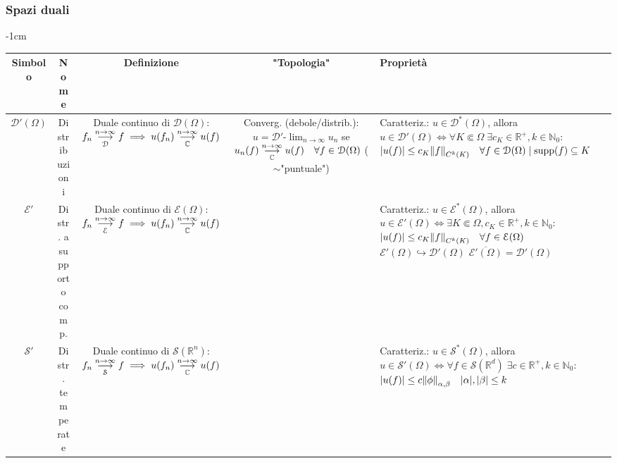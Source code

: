 \documentclass[a4paper,10pt]{article}
\theoremstyle{definition}
\newcommand{\na}{\mathbb{N}} %
\newcommand{\re}{\mathbb{R}} %
\newcommand{\im}{\mathbb{C}} %
\newcommand{\inj}{\hookrightarrow} %
\newcommand{\supp}{\text{supp}} %
\newcommand{\llim}[2]{#2\text{-}\lim_{#1\to\infty}} %
\newcommand{\limm}[2]{\overunderset{#1\to\infty}{#2}{\longrightarrow}} %
\theoremstyle{indentdefinition}
\theoremstyle{indenttheorem}
\theoremstyle{myremark}
\theoremstyle{indentgeneral}
\begin{document}
\begin{landscape}
\subsubsection{Spazi duali}
\begin{adjustwidth}{}{-1cm}
\begin{table}[H]
    \centering
    \begin{tabular}{|c|c|c|c|l|}\hline
         Simbolo&  Nome&  Definizione& "Topologia"& Proprietà\\ \hline
 $\mathcal{D}'(\Omega)$& Distribuzioni& \shortstack{Duale continuo di $\mathcal{D}(\Omega)$:\\
 $f_n\limm{n}{\mathcal{D}}f\implies u(f_n)\limm{n}{\im}u(f)$}& \shortstack{Converg. (debole/distrib.):\\ $u=\llim{n}{\mathcal{D}'}u_n$ se \\$u_n(f)\limm{n}{\im}u(f)\quad\forall f\in \mathcal{D}(\Omega)$ \\($\sim$"puntuale")}&\shortstack{Caratteriz.: $u\in\mathcal{D}^*(\Omega)$, allora $u\in\mathcal{D}'(\Omega) \iff\forall K\Subset \Omega\;\exists c_K\in\re^+,k\in\na_0:$ \\ $ \abs{u(f)}\le c_K\norm{f}_{C^k(K)}\quad \forall f\in\mathcal{D}(\Omega)\mid\supp(f)\subseteq K$ } \\\hline
 $\mathcal{E}'$& Distr. a supporto comp.& \shortstack{Duale continuo di $\mathcal{E}(\Omega)$: \\
 $f_n\limm{n}{\mathcal{E}}f\implies u(f_n)\limm{n}{\im}u(f)$}& & \shortstack{Caratteriz.: $u\in\mathcal{E}^*(\Omega)$, allora $u\in\mathcal{E}'(\Omega) \iff\exists K\Subset \Omega, c_K\in\re^+,k\in\na_0:$ \\ $ \abs{u(f)}\le c_K\norm{f}_{C^k(K)}\quad \forall f\in\mathcal{E}(\Omega)$ \\ \\ $\mathcal{E}'(\Omega)\inj\mathcal{D}'(\Omega)$\\$\overline{\mathcal{E}'(\Omega)}=\mathcal{D}'(\Omega)$}\\\hline
 $\mathcal{S}'$& Distr. temperate& \shortstack{Duale continuo di $\mathcal{S}(\re^n)$: \\
 $f_n\limm{n}{\mathcal{S}}f\implies u(f_n)\limm{n}{\im}u(f)$}& & \shortstack{Caratteriz.: $u\in\mathcal{S}^*(\Omega)$, allora $u\in\mathcal{S}'(\Omega) \iff\forall f\in\mathcal{S}(\re^d)\;\exists c\in\re^+,k\in\na_0:$ \\ $ \abs{u(f)}\le c\norm{\phi}_{\alpha,\beta}\quad \abs{\alpha},\abs{\beta}\le k$ }\\\hline
    \end{tabular}
\end{table}
\end{adjustwidth}
\end{landscape}
\end{document}
